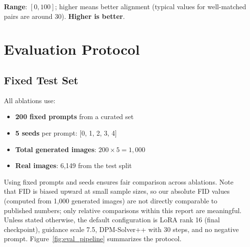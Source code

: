 \documentclass[11pt]{article}
\begin{document}
\textbf{Range}: $[0, 100]$; higher means better alignment (typical values for well-matched pairs are around 30).
\textbf{Higher is better}.

\section{Evaluation Protocol}

\subsection{Fixed Test Set}

All ablations use:
\begin{itemize}
    \item \textbf{200 fixed prompts} from a curated set
    \item \textbf{5 seeds} per prompt: [0, 1, 2, 3, 4]
    \item \textbf{Total generated images}: $200 \times 5 = 1{,}000$
    \item \textbf{Real images}: 6,149 from the test split
\end{itemize}

Using fixed prompts and seeds ensures fair comparison across ablations. Note that FID is biased upward at small sample sizes, so our absolute FID values (computed from 1,000 generated images) are not directly comparable to published numbers; only relative comparisons within this report are meaningful. Unless stated otherwise, the default configuration is LoRA rank 16 (final checkpoint), guidance scale 7.5, DPM-Solver++ with 30 steps, and no negative prompt. Figure~\ref{fig:eval_pipeline} summarizes the protocol.
\end{document}
